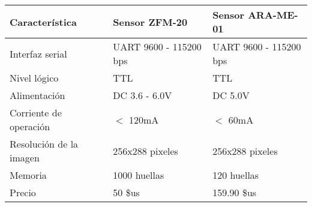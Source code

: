 \begin{tabular}{|C{4cm}|C{4.5cm}|C{4.5cm}|}
  \hline
  Característica & Sensor ZFM-20 & Sensor ARA-ME-01 \\
  \hline
  Interfaz serial & UART 9600 - 115200 bps & UART 9600 - 115200 bps \\
  \hline
  Nivel lógico & TTL & TTL \\
  \hline
  Alimentación & DC 3.6 - 6.0V & DC 5.0V \\
  \hline
  Corriente de operación & $ < $ 120mA & $ < $ 60mA \\
  \hline
  Resolución de la imagen & 256x288 pixeles & 256x288 pixeles \\
  \hline
  Memoria & 1000 huellas & 120 huellas \\
  \hline
  Precio & 50 \$us & 159.90 \$us \\
  \hline
\end{tabular}